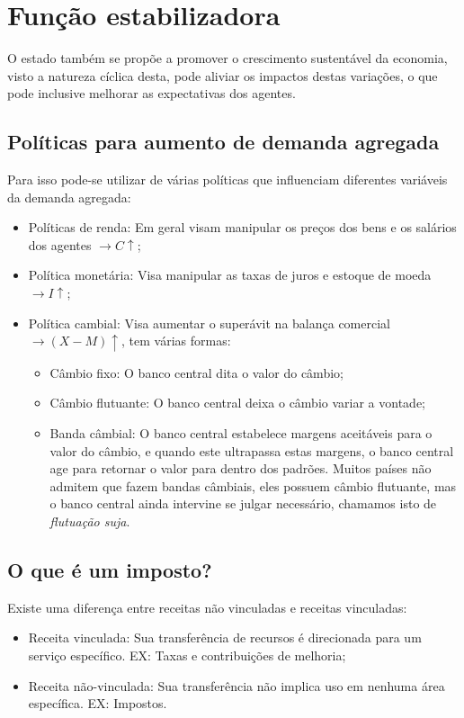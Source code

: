 \documentclass[12pt,a4paper,oneside,brazil]{abntex2}
\begin{document}
\section{Função estabilizadora}
O estado também se propõe a promover o crescimento sustentável da economia, visto a natureza cíclica desta, pode aliviar os impactos destas variações, o que pode inclusive melhorar as expectativas dos agentes. 
\subsection{Políticas para aumento de demanda agregada}
Para isso pode-se utilizar de várias políticas que influenciam diferentes variáveis da demanda agregada:
\begin{itemize}
\item Políticas de renda: Em geral visam manipular os preços dos bens e os salários dos agentes $ \rightarrow C \uparrow$;
\item Política monetária: Visa manipular as taxas de juros e estoque de moeda $ \rightarrow I \uparrow$;
\item Política cambial: Visa aumentar o superávit na balança comercial $ \rightarrow (X - M) \uparrow$, tem várias formas:
\begin{itemize}
\item Câmbio fixo: O banco central dita o valor do câmbio;
\item Câmbio flutuante: O banco central deixa o câmbio variar a vontade;
\item Banda câmbial: O banco central estabelece margens aceitáveis para o valor do câmbio, e quando este ultrapassa estas margens, o banco central age para retornar o valor para dentro dos padrões. Muitos países não admitem que fazem bandas câmbiais, eles possuem câmbio flutuante, mas o banco central ainda intervine se julgar necessário, chamamos isto de \emph{flutuação suja}.
\end{itemize}
\end{itemize}
\subsection{O que é um imposto?}
Existe uma diferença entre receitas não vinculadas e receitas vinculadas:
\begin{itemize}
\item Receita vinculada: Sua transferência de recursos é direcionada para um serviço específico. EX: Taxas e contribuições de melhoria;
\item Receita não-vinculada: Sua transferência não implica uso em nenhuma área específica. EX: Impostos.
\end{itemize}
\end{document}
